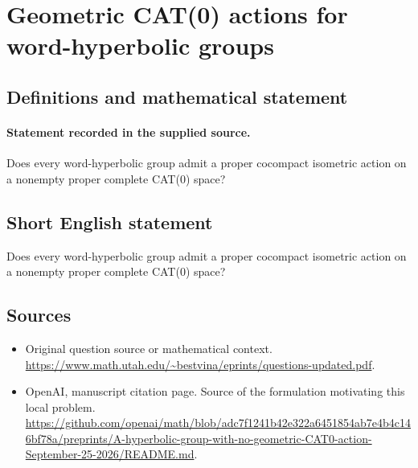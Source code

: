 \documentclass[11pt]{article}
\begin{document}
\section*{Geometric CAT(0) actions for word-hyperbolic groups}\label{30007194}
\subsection{Definitions and mathematical statement}
\paragraph{Statement recorded in the supplied source.}
Does every word-hyperbolic group admit a proper cocompact isometric action on a nonempty proper complete CAT(0) space?
\subsection{Short English statement}
Does every word-hyperbolic group admit a proper cocompact isometric action on a nonempty proper complete CAT(0) space?
\subsection{Sources}
\begin{itemize}
\item[S1] Original question source or mathematical context.
\url{https://www.math.utah.edu/~bestvina/eprints/questions-updated.pdf}.
\item[S2] OpenAI, manuscript citation page. Source of the formulation motivating this local problem.
\url{https://github.com/openai/math/blob/adc7f1241b42e322a6451854ab7e4b4c146bf78a/preprints/A-hyperbolic-group-with-no-geometric-CAT0-action-September-25-2026/README.md}.
\end{itemize}
\end{document}
